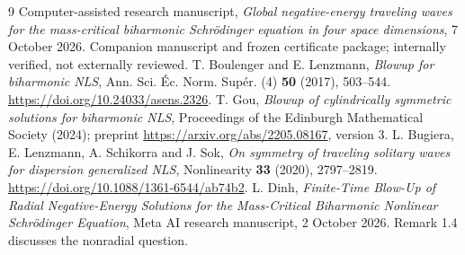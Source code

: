 \documentclass[11pt,a4paper]{article}
\theoremstyle{remark}\newtheorem{remark}[theorem]{Remark}
\begin{document}
\begin{thebibliography}{9}
 Computer-assisted research manuscript, \emph{Global negative-energy traveling waves for the mass-critical biharmonic Schr\"odinger equation in four space dimensions}, 7 October 2026. Companion manuscript and frozen certificate package; internally verified, not externally reviewed.
 T. Boulenger and E. Lenzmann, \emph{Blowup for biharmonic NLS}, Ann. Sci. \'Ec. Norm. Sup\'er. (4) \textbf{50} (2017), 503--544. \url{https://doi.org/10.24033/asens.2326}.
 T. Gou, \emph{Blowup of cylindrically symmetric solutions for biharmonic NLS}, Proceedings of the Edinburgh Mathematical Society (2024); preprint \url{https://arxiv.org/abs/2205.08167}, version 3.
 L. Bugiera, E. Lenzmann, A. Schikorra and J. Sok, \emph{On symmetry of traveling solitary waves for dispersion generalized NLS}, Nonlinearity \textbf{33} (2020), 2797--2819. \url{https://doi.org/10.1088/1361-6544/ab74b2}.
 L. Dinh, \emph{Finite-Time Blow-Up of Radial Negative-Energy Solutions for the Mass-Critical Biharmonic Nonlinear Schr\"odinger Equation}, Meta AI research manuscript, 2 October 2026. Remark 1.4 discusses the nonradial question.
\end{thebibliography}
\end{document}
